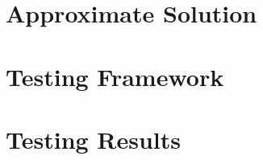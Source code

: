 \documentclass[paper=letter, fontsize=11pt]{article}
\begin{document}
\section*{Approximate Solution}

\cite{conitzer2006computing}

\section*{Testing Framework}

\section*{Testing Results}



\end{document}
